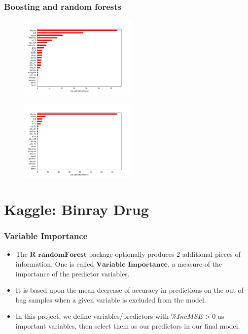 \documentclass{beamer}
\begin{document}
\begin{frame}
\frametitle{Boosting and random forests}
\begin{figure}
\centering
\begin{minipage}{.5\textwidth}
  \centering
  \includegraphics[width=.8\linewidth,height=4cm]{crime_boosttu}
  \label{fig:test1}
\end{minipage}%
\begin{minipage}{.5\textwidth}
  \centering
  \includegraphics[width=.8\linewidth,height=4cm]{crime_randtu}
  \label{fig:test2}
\end{minipage}
\end{figure}
\end{frame}


\section{Kaggle: Binray Drug}
\begin{frame}
\frametitle{Variable Importance}
\begin{itemize}
\item The $\textbf{R randomForest}$ package optionally produces 2 additional pieces of information. One is called $\textbf{Variable Importance}$, a measure of the importance of the predictor variables.

\item It is based upon the mean decrease of accuracy in predictions on the out of bag samples
when a given variable is excluded from the model.

\item In this project, we define variables/predictors with $\%IncMSE > 0 $ as important variables, then select them as our predictors in our final model.	
\end{itemize}
\end{frame}
\end{document}
